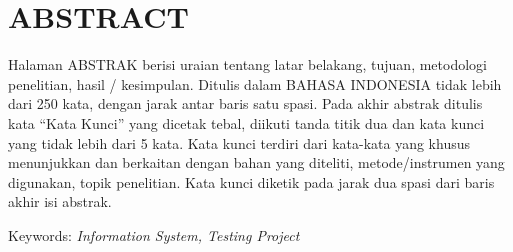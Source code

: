 

\chapter*{ABSTRACT}

\begin{singlespace}
\begin{justify}
    Halaman ABSTRAK berisi uraian tentang latar belakang, tujuan, metodologi penelitian, hasil / kesimpulan. Ditulis dalam BAHASA INDONESIA tidak lebih dari 250 kata, dengan jarak antar baris satu spasi.
Pada akhir abstrak ditulis kata “Kata Kunci” yang dicetak tebal, diikuti tanda titik dua dan kata kunci yang tidak lebih dari 5 kata. Kata kunci terdiri dari kata-kata yang khusus menunjukkan dan berkaitan dengan bahan yang diteliti, metode/instrumen yang digunakan, topik penelitian. Kata kunci diketik pada jarak dua spasi dari baris akhir isi abstrak.
\end{justify}
Keywords: \textit{Information System, Testing Project}
\end{singlespace}

\newpage